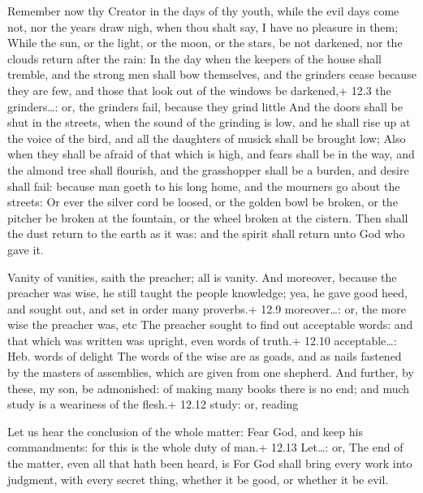  Remember now thy Creator in the days of thy youth, while
the evil days come not, nor the years draw nigh, when thou shalt say, I
have no pleasure in them;  While the sun, or the light, or
the moon, or the stars, be not darkened, nor the clouds return after the
rain:  In the day when the keepers of the house shall
tremble, and the strong men shall bow themselves, and the grinders cease
because they are few, and those that look out of the windows be
darkened,+ 12.3 the grinders\ldots: or, the grinders fail, because they
grind little  And the doors shall be shut in the streets,
when the sound of the grinding is low, and he shall rise up at the voice
of the bird, and all the daughters of musick shall be brought low;
 Also when they shall be afraid of that which is high, and
fears shall be in the way, and the almond tree shall flourish, and the
grasshopper shall be a burden, and desire shall fail: because man goeth
to his long home, and the mourners go about the streets:  Or
ever the silver cord be loosed, or the golden bowl be broken, or the
pitcher be broken at the fountain, or the wheel broken at the cistern.
 Then shall the dust return to the earth as it was: and the
spirit shall return unto God who gave it.

 Vanity of vanities, saith the preacher; all is vanity.
 And moreover, because the preacher was wise, he still
taught the people knowledge; yea, he gave good heed, and sought out, and
set in order many proverbs.+ 12.9 moreover\ldots: or, the more wise the
preacher was, etc  The preacher sought to find out
acceptable words: and that which was written was upright, even words of
truth.+ 12.10 acceptable\ldots: Heb. words of delight  The
words of the wise are as goads, and as nails fastened by the masters of
assemblies, which are given from one shepherd.  And
further, by these, my son, be admonished: of making many books there is
no end; and much study is a weariness of the flesh.+ 12.12 study: or,
reading

 Let us hear the conclusion of the whole matter: Fear
God, and keep his commandments: for this is the whole duty of man.+
12.13 Let\ldots: or, The end of the matter, even all that hath been
heard, is  For God shall bring every work into judgment,
with every secret thing, whether it be good, or whether it be evil.
